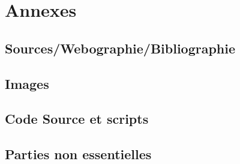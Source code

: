 \documentclass[a4paper,12pt,one side,titlepage]{report}
\begin{document}


\part{Annexes}
\chapter{Sources/Webographie/Bibliographie}

\chapter{Images}

\chapter{Code Source et scripts}

\chapter{Parties non essentielles}

%



\end{document}
